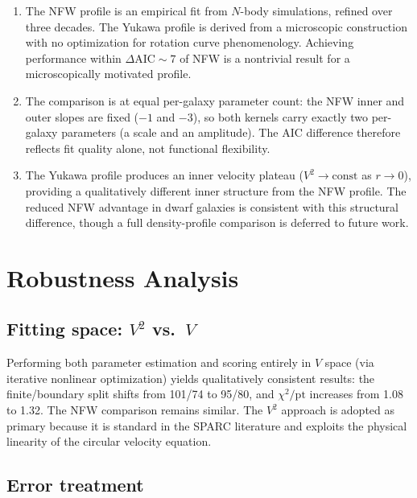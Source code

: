\documentclass[11pt,a4paper]{article}
\begin{document}
\begin{enumerate}
\item The NFW profile is an empirical fit from $N$-body simulations,
  refined over three decades.
  The Yukawa profile is derived from a microscopic construction
  with no optimization for rotation curve phenomenology.
  Achieving performance within $\Delta\mathrm{AIC} \sim 7$ of NFW
  is a nontrivial result for a microscopically motivated profile.

\item The comparison is at equal per-galaxy parameter count: the
  NFW inner and outer slopes are fixed ($-1$ and $-3$), so both
  kernels carry exactly two per-galaxy parameters (a scale and an
  amplitude).  The AIC difference therefore reflects fit quality
  alone, not functional flexibility.

\item The Yukawa profile produces an inner velocity plateau
  ($V^2 \to \mathrm{const}$ as $r \to 0$), providing a qualitatively
  different inner structure from the NFW profile.
  The reduced NFW advantage in dwarf galaxies is consistent with
  this structural difference, though a full density-profile
  comparison is deferred to future work.
\end{enumerate}


\section{Robustness Analysis}
\label{sec:robust}

\subsection{Fitting space: $V^2$ vs.\ $V$}

Performing both parameter estimation and scoring entirely in
$V$ space (via iterative nonlinear optimization) yields
qualitatively consistent results: the finite/boundary split
shifts from 101/74 to 95/80, and $\chi^2/\mathrm{pt}$ increases
from 1.08 to 1.32.
The NFW comparison remains similar.
The $V^2$ approach is adopted as primary because it is standard
in the SPARC literature and exploits the physical linearity of
the circular velocity equation.

\subsection{Error treatment}
\end{document}
